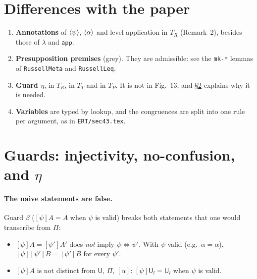 \documentclass[10pt]{article}
\newcommand{\new}[1]{{\color{blue!70!black}#1}}  %
\newcommand{\U}{\mathsf{U}}
\newcommand{\lam}{\lambda}
\newcommand{\app}{\mathsf{app}}
\newcommand{\TR}{T_R}
\newcommand{\TP}{T_P}
\newcommand{\TT}{T_T}
\newcommand{\grd}[2]{[#1]#2}
\newcommand{\glam}[2]{\langle #1\rangle #2}
\newcommand{\llam}[1]{\langle\alpha\rangle #1}
\newcommand{\agda}[1]{\texttt{#1}}
\theoremstyle{remark}
\begin{document}
\section{Differences with the paper}\label{sec:diff}

\begin{enumerate}
\item \textbf{Annotations} of $\glam\psi$, $\llam$ and level application in
  $\TR$ (Remark~2), besides those of $\lam$ and $\app$.
\item \textbf{Presupposition premises} (grey).  They are admissible: see the
  \agda{mk-*} lemmas of \agda{RussellMeta} and \agda{RussellLeq}.
\item \new{\textbf{Guard $\eta$}}, in $\TR$, in $\TT$ and in $\TP$.  It is
  not in Fig.~13, and \S\ref{sec:guard} explains why it is needed.
\item \textbf{Variables} are typed by lookup, and the congruences are split
  into one rule per argument, as in \texttt{ERT/sec43.tex}.
\end{enumerate}

\section{Guards: injectivity, no-confusion, and \texorpdfstring{$\eta$}{eta}}\label{sec:guard}

\paragraph{The naive statements are false.}  Guard $\beta$
($\grd\psi A=A$ when $\psi$ is valid) breaks both statements that one would
transcribe from $\Pi$:
\begin{itemize}
\item $\grd\psi A=\grd{\psi'}A'$ does \emph{not} imply $\psi\Leftrightarrow\psi'$.
  With $\psi$ valid (e.g.\ $\alpha=\alpha$), $\grd\psi\grd{\psi'}B=\grd{\psi'}B$
  for every $\psi'$.
\item $\grd\psi A$ is not distinct from $\U$, $\Pi$, $[\alpha]$:
  $\grd\psi\U_l=\U_l$ when $\psi$ is valid.
\end{itemize}
\end{document}
